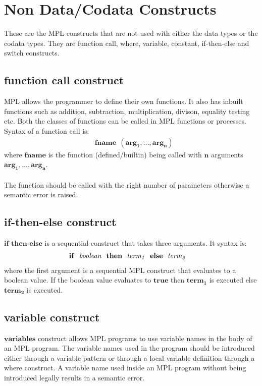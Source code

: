 \documentclass[11pt]{article}
\begin{document}
\section {Non Data/Codata Constructs}\label{SeqMPL:IndCons}
These are the MPL constructs that are not used with either the data types or the codata types. They are {\sf function call}, {\sf where}, {\sf variable}, {\sf constant}, {\sf if-then-else} and {\sf switch} constructs.
\subsection {function call construct}
MPL allows the programmer to define their own functions. It also has inbuilt functions such as addition, subtraction, multiplication, divison, equality testing etc. Both the classes of functions can be called in MPL functions or processes. Syntax of a function call is:
\begin{align*} 
&\mathbf{fname~~(arg_1,\ldots,arg_n)}
\end{align*}
where $\mathbf{fname}$ is the function (defined/builtin) being called with $\mathbf{n}$ arguments $\mathbf{arg_1,\ldots,arg_n}$.
~~\\~~\\
The function should be called with the right number of parameters otherwise a semantic error is raised. 
\subsection {if-then-else construct}
$\mathbf{if\texttt{-} then\texttt{-}else}$ is a sequential construct that takes three arguments. It syntax is:
\begin{align*} 
&\mathbf{if~~{\it boolean} ~~then~~ {\it term_1}~~ else~~ {\it term_2}}
\end{align*}
where the first argument is a sequential MPL construct that evaluates to a boolean value. If the boolean value evaluates to $\mathbf{true}$ then $\mathbf{term_1}$ is executed else $\mathbf{term_2}$ is executed.
\subsection {variable construct}
$\mathbf{variables}$ construct allows MPL programs to use variable names in the body of an MPL program. The variable names used in the program should be introduced either through a variable pattern or through a local variable definition through a where construct. A variable name used inside an MPL program without being introduced legally results in a semantic error.
\end{document}
